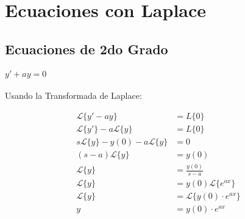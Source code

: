 \documentclass[12pt]{report}                                %
\begin{document}
\chapter{Ecuaciones con Laplace}


    \clearpage
    \section{Ecuaciones de 2do Grado}

        \subsubsection{$y'+ay=0$}
            Usando la Transformada de Laplace:

            \begin{equation*}   
            \begin{split}
                \mathscr{L}\{ y'-ay \} &= L\{0\}                            \\
                \mathscr{L}\{y'\}-a\mathscr{L}\{y\} &= L\{0\}               \\
                s\mathscr{L}\{y\}-y(0)-a\mathscr{L}\{y\} &= 0               \\
                (s-a)\mathscr{L}\{y\} &= y(0)                               \\
                \mathscr{L}\{y\} &= \frac{y(0)}{s-a}                        \\
                \mathscr{L}\{y\} &= y(0) \mathscr{L}\{e^{ax}\}              \\
                \mathscr{L}\{y\} &= \mathscr{L}\{y(0) \cdot e^{ax}\}        \\
                y &= y(0) \cdot e^{ax}                                      \\
            \end{split}
            \end{equation*}


\end{document}
